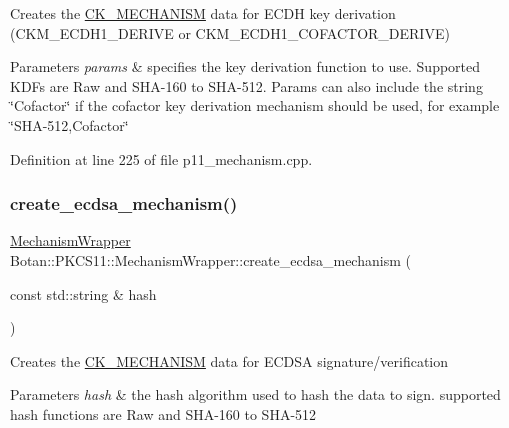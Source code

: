 Creates the \mbox{\hyperlink{struct_c_k___m_e_c_h_a_n_i_s_m}{C\+K\+\_\+\+M\+E\+C\+H\+A\+N\+I\+SM}} data for E\+C\+DH key derivation (C\+K\+M\+\_\+\+E\+C\+D\+H1\+\_\+\+D\+E\+R\+I\+VE or C\+K\+M\+\_\+\+E\+C\+D\+H1\+\_\+\+C\+O\+F\+A\+C\+T\+O\+R\+\_\+\+D\+E\+R\+I\+VE) 
\begin{DoxyParams}{Parameters}
{\em params} & specifies the key derivation function to use. Supported K\+D\+Fs are Raw and S\+H\+A-\/160 to S\+H\+A-\/512. Params can also include the string \char`\"{}\+Cofactor\char`\"{} if the cofactor key derivation mechanism should be used, for example \char`\"{}\+S\+H\+A-\/512,\+Cofactor\char`\"{} \\
\hline
\end{DoxyParams}


Definition at line 225 of file p11\+\_\+mechanism.\+cpp.

\mbox{\label{class_botan_1_1_p_k_c_s11_1_1_mechanism_wrapper_ab5cb786b286844ffb2ea2af2a232459d}} 
\subsubsection{\texorpdfstring{create\+\_\+ecdsa\+\_\+mechanism()}{create\_ecdsa\_mechanism()}}
{\footnotesize\ttfamily \mbox{\hyperlink{class_botan_1_1_p_k_c_s11_1_1_mechanism_wrapper}{Mechanism\+Wrapper}} Botan\+::\+P\+K\+C\+S11\+::\+Mechanism\+Wrapper\+::create\+\_\+ecdsa\+\_\+mechanism (\begin{DoxyParamCaption}\item[{const std\+::string \&}]{hash }\end{DoxyParamCaption})\hspace{0.3cm}{\ttfamily [static]}}

Creates the \mbox{\hyperlink{struct_c_k___m_e_c_h_a_n_i_s_m}{C\+K\+\_\+\+M\+E\+C\+H\+A\+N\+I\+SM}} data for E\+C\+D\+SA signature/verification 
\begin{DoxyParams}{Parameters}
{\em hash} & the hash algorithm used to hash the data to sign. supported hash functions are Raw and S\+H\+A-\/160 to S\+H\+A-\/512 \\
\hline
\end{DoxyParams}


